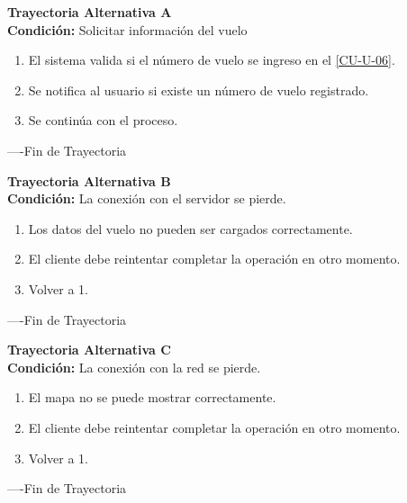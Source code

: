 \begin{flushleft}
	\hypertarget{TrayectoriaA_CU-U-09}{}
	\textbf{Trayectoria Alternativa A}\\
	\textbf{Condición:} Solicitar información del vuelo \\
	\begin{enumerate}
		\item El sistema valida si el número de vuelo se ingreso en el \hyperlink{CU-U-06}{[CU-U-06]}. 
		\item Se notifica al usuario si existe un número de vuelo registrado.
		\item Se continúa con el proceso.
	\end{enumerate}
\end{flushleft}
----Fin de Trayectoria

\begin{flushleft}
	\hypertarget{TrayectoriaB_CU-U-09}{}
	\textbf{Trayectoria Alternativa B}\\
	\textbf{Condición:} La conexión con el servidor se pierde. \\
	\begin{enumerate}
		\item Los datos del vuelo no pueden ser cargados correctamente. 
		\item El cliente debe reintentar completar la operación en otro momento. 
		\item Volver a 1.
	\end{enumerate}
\end{flushleft}
----Fin de Trayectoria

\begin{flushleft}
	\hypertarget{TrayectoriaC_CU-U-09}{}
	\textbf{Trayectoria Alternativa C}\\
	\textbf{Condición:} La conexión con la red se pierde. \\
	\begin{enumerate}
		\item El mapa no se puede mostrar correctamente. 
		\item El cliente debe reintentar completar la operación en otro momento. 
		\item Volver a 1.
	\end{enumerate}
\end{flushleft}
----Fin de Trayectoria